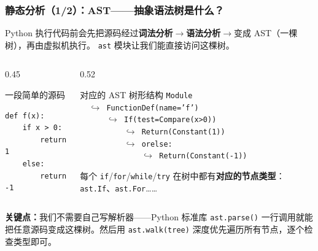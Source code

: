 \documentclass[presentation,aspectratio=169]{ctexbeamer}
\begin{document}
\begin{frame}[fragile]
\frametitle{静态分析（1/2）：AST——抽象语法树是什么？}
{\small Python 执行代码前会先把源码经过\textbf{词法分析}$\rightarrow$\textbf{语法分析}$\rightarrow$变成 AST（一棵树），再由虚拟机执行。%
\texttt{ast} 模块让我们能直接访问这棵树。}

\vspace{0.2cm}
\begin{columns}[T]
\begin{column}{0.45\textwidth}
\begin{block}{\small 一段简单的源码}
{\small
\begin{verbatim}
def f(x):
    if x > 0:
        return 1
    else:
        return -1
\end{verbatim}}
\end{block}
\end{column}
\begin{column}{0.52\textwidth}
\begin{block}{\small 对应的 AST 树形结构}
{\small
\texttt{Module} \\
\texttt{~~$\hookrightarrow$ FunctionDef(name='f')} \\
\texttt{~~~~~~$\hookrightarrow$ If(test=Compare(x>0))} \\
\texttt{~~~~~~~~~~$\hookrightarrow$ Return(Constant(1))} \\
\texttt{~~~~~~~~~~$\hookrightarrow$ orelse:} \\
\texttt{~~~~~~~~~~~~~~$\hookrightarrow$ Return(Constant(-1))}}

\vspace{0.15cm}
{\small 每个 \texttt{if}/\texttt{for}/\texttt{while}/\texttt{try} 在树中都有\textbf{对应的节点类型}：\texttt{ast.If}、\texttt{ast.For}……}
\end{block}
\end{column}
\end{columns}

\vspace{0.2cm}
{\small\textbf{关键点：}我们不需要自己写解析器——Python 标准库 \texttt{ast.parse()} 一行调用就能把任意源码变成这棵树。然后用 \texttt{ast.walk(tree)} 深度优先遍历所有节点，逐个检查类型即可。}
\end{frame}

\end{document}
